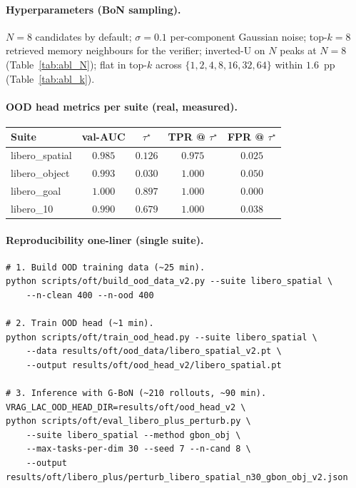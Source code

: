 \documentclass{article}
\begin{document}
\paragraph{Hyperparameters (BoN sampling).}
$N{=}8$ candidates by default; $\sigma{=}0.1$ per-component Gaussian
noise; top-$k{=}8$ retrieved memory neighbours for the verifier;
inverted-U on $N$ peaks at $N{=}8$ (Table~\ref{tab:abl_N}); flat in
top-$k$ across $\{1, 2, 4, 8, 16, 32, 64\}$ within $1.6$~pp
(Table~\ref{tab:abl_k}).

\paragraph{OOD head metrics per suite (real, measured).}
\begin{center}\small
\begin{tabular}{lcccc}
\toprule
Suite           & val-AUC & $\tau^\star$ & TPR @ $\tau^\star$ & FPR @ $\tau^\star$ \\
\midrule
libero\_spatial & $0.985$ & $0.126$ & $0.975$ & $0.025$ \\
libero\_object  & $0.993$ & $0.030$ & $1.000$ & $0.050$ \\
libero\_goal    & $1.000$ & $0.897$ & $1.000$ & $0.000$ \\
libero\_10      & $0.990$ & $0.679$ & $1.000$ & $0.038$ \\
\bottomrule
\end{tabular}
\end{center}

\paragraph{Reproducibility one-liner (single suite).}
\begin{verbatim}
# 1. Build OOD training data (~25 min).
python scripts/oft/build_ood_data_v2.py --suite libero_spatial \
    --n-clean 400 --n-ood 400

# 2. Train OOD head (~1 min).
python scripts/oft/train_ood_head.py --suite libero_spatial \
    --data results/oft/ood_data/libero_spatial_v2.pt \
    --output results/oft/ood_head_v2/libero_spatial.pt

# 3. Inference with G-BoN (~210 rollouts, ~90 min).
VRAG_LAC_OOD_HEAD_DIR=results/oft/ood_head_v2 \
python scripts/oft/eval_libero_plus_perturb.py \
    --suite libero_spatial --method gbon_obj \
    --max-tasks-per-dim 30 --seed 7 --n-cand 8 \
    --output results/oft/libero_plus/perturb_libero_spatial_n30_gbon_obj_v2.json
\end{verbatim}
\end{document}
